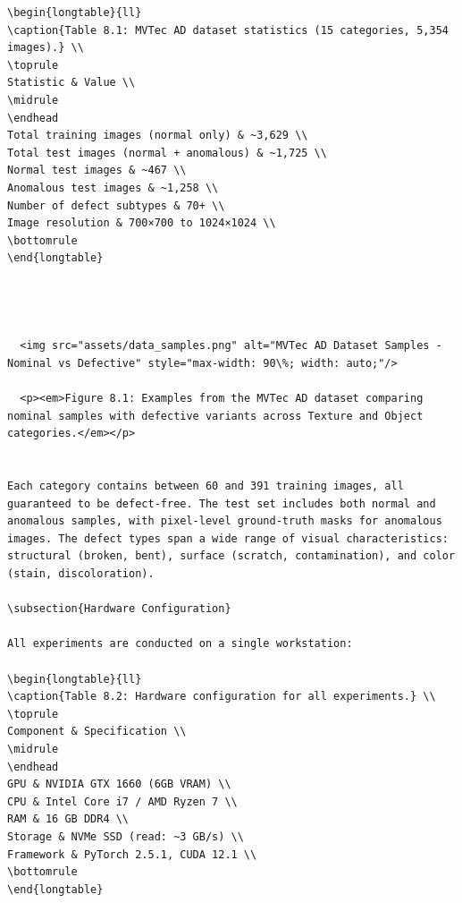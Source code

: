 \documentclass[12pt,a4paper,oneside]{report}
\begin{document}
\begin{verbatim}
\begin{longtable}{ll}
\caption{Table 8.1: MVTec AD dataset statistics (15 categories, 5,354 images).} \\
\toprule
Statistic & Value \\
\midrule
\endhead
Total training images (normal only) & ~3,629 \\
Total test images (normal + anomalous) & ~1,725 \\
Normal test images & ~467 \\
Anomalous test images & ~1,258 \\
Number of defect subtypes & 70+ \\
Image resolution & 700×700 to 1024×1024 \\
\bottomrule
\end{longtable}




  <img src="assets/data_samples.png" alt="MVTec AD Dataset Samples - Nominal vs Defective" style="max-width: 90\%; width: auto;"/>
  
  <p><em>Figure 8.1: Examples from the MVTec AD dataset comparing nominal samples with defective variants across Texture and Object categories.</em></p>


Each category contains between 60 and 391 training images, all guaranteed to be defect-free. The test set includes both normal and anomalous samples, with pixel-level ground-truth masks for anomalous images. The defect types span a wide range of visual characteristics: structural (broken, bent), surface (scratch, contamination), and color (stain, discoloration).

\subsection{Hardware Configuration}

All experiments are conducted on a single workstation:

\begin{longtable}{ll}
\caption{Table 8.2: Hardware configuration for all experiments.} \\
\toprule
Component & Specification \\
\midrule
\endhead
GPU & NVIDIA GTX 1660 (6GB VRAM) \\
CPU & Intel Core i7 / AMD Ryzen 7 \\
RAM & 16 GB DDR4 \\
Storage & NVMe SSD (read: ~3 GB/s) \\
Framework & PyTorch 2.5.1, CUDA 12.1 \\
\bottomrule
\end{longtable}




\end{verbatim}
\end{document}
